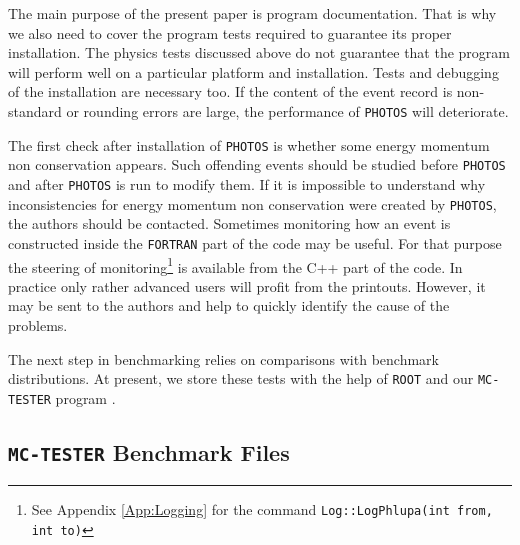 \documentclass[]{Photos_interface_design}
\begin{document}
The main purpose of the present paper is program documentation. That is why
we also need to cover the program tests required to guarantee its proper installation.
The physics tests discussed above 
do not guarantee that the program will perform well on a particular platform and installation. Tests and debugging of the installation
are necessary too.  If the content of the event record is non-standard or rounding errors are large, the performance of {\tt PHOTOS} will deteriorate.


The first check after installation of {\tt PHOTOS} is whether some energy momentum non 
conservation appears. Such offending events should be studied
before {\tt PHOTOS}  and after {\tt PHOTOS} is run to modify them.
If it is impossible to understand why inconsistencies for energy momentum non 
conservation were created by {\tt PHOTOS}, the authors should be contacted. Sometimes
monitoring how an event is constructed inside the {\tt FORTRAN} part of the code
may be useful. For that purpose the steering of monitoring\footnote{See Appendix \ref{App:Logging}
for the command {\tt Log::LogPhlupa(int from, int to)}}
 is
available from the C++ part of the code. In practice only rather
 advanced users will profit from the printouts. However, it may be sent to
the authors and help to quickly identify the cause of the problems.


The next step in benchmarking relies on comparisons with benchmark distributions. 
At present, we store these tests with the help of {\tt ROOT} \cite{Antcheva:2009zz} and our {\tt MC-TESTER} program \cite{Davidson:2008ma}.



\subsection{{\tt MC-TESTER} Benchmark Files}
\end{document}
